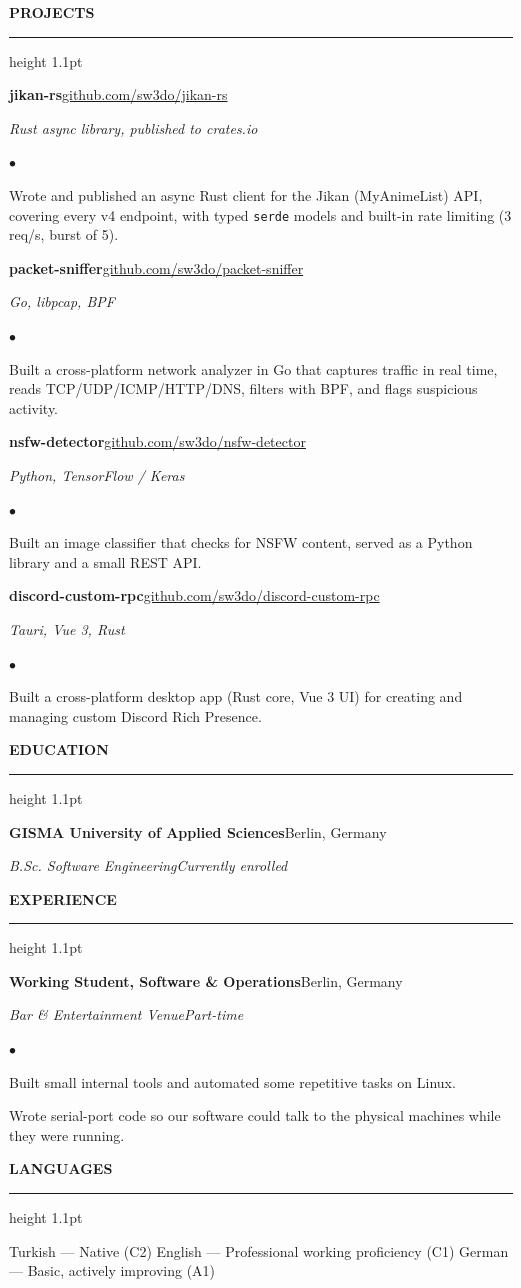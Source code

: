 \documentclass[a4paper,11pt]{article}
\newenvironment{tight}
  {\begin{list}{\textcolor{accent}{\small$\bullet$}}{%
      \setlength{\leftmargin}{1.4em}%
      \setlength{\itemsep}{1.5pt}%
      \setlength{\topsep}{2pt}%
      \setlength{\parsep}{0pt}}}
  {\end{list}}
\newcommand{\cvsection}[1]{%
  \vspace{9pt}%
  {\color{accent}\large\bfseries\MakeUppercase{#1}}\par\vspace{2pt}%
  {\color{accent}\hrule height 1.1pt}\vspace{5pt}%
}
\newcommand{\entry}[2]{\textbf{#1}\hfill{\color{muted}#2}\par}
\newcommand{\subentry}[2]{{\itshape #1}\hfill{\color{muted}\itshape #2}\par\vspace{2pt}}
\begin{document}
\cvsection{Projects}
\small
\entry{jikan-rs}{\href{https://github.com/sw3do/jikan-rs}{github.com/sw3do/jikan-rs}}
{\color{muted}\itshape Rust async library, published to crates.io}\par
\begin{tight}
  \item Wrote and published an async Rust client for the Jikan (MyAnimeList) API, covering every v4 endpoint, with typed \texttt{serde} models and built-in rate limiting (3 req/s, burst of 5).
\end{tight}
\vspace{3pt}
\entry{packet-sniffer}{\href{https://github.com/sw3do/packet-sniffer}{github.com/sw3do/packet-sniffer}}
{\color{muted}\itshape Go, libpcap, BPF}\par
\begin{tight}
  \item Built a cross-platform network analyzer in Go that captures traffic in real time, reads TCP/UDP/ICMP/HTTP/DNS, filters with BPF, and flags suspicious activity.
\end{tight}
\vspace{3pt}
\entry{nsfw-detector}{\href{https://github.com/sw3do/nsfw-detector}{github.com/sw3do/nsfw-detector}}
{\color{muted}\itshape Python, TensorFlow / Keras}\par
\begin{tight}
  \item Built an image classifier that checks for NSFW content, served as a Python library and a small REST API.
\end{tight}
\vspace{3pt}
\entry{discord-custom-rpc}{\href{https://github.com/sw3do/discord-custom-rpc}{github.com/sw3do/discord-custom-rpc}}
{\color{muted}\itshape Tauri, Vue 3, Rust}\par
\begin{tight}
  \item Built a cross-platform desktop app (Rust core, Vue 3 UI) for creating and managing custom Discord Rich Presence.
\end{tight}

\cvsection{Education}
\small
\entry{GISMA University of Applied Sciences}{Berlin, Germany}
\subentry{B.Sc. Software Engineering}{Currently enrolled}

\cvsection{Experience}
\small
\entry{Working Student, Software \& Operations}{Berlin, Germany}
\subentry{Bar \& Entertainment Venue}{Part-time}
\begin{tight}
  \item Built small internal tools and automated some repetitive tasks on Linux.
  \item Wrote serial-port code so our software could talk to the physical machines while they were running.
\end{tight}

\cvsection{Languages}
\small
Turkish --- Native (C2) \quad\textbar\quad English --- Professional working proficiency (C1) \quad\textbar\quad German --- Basic, actively improving (A1)
\end{document}
